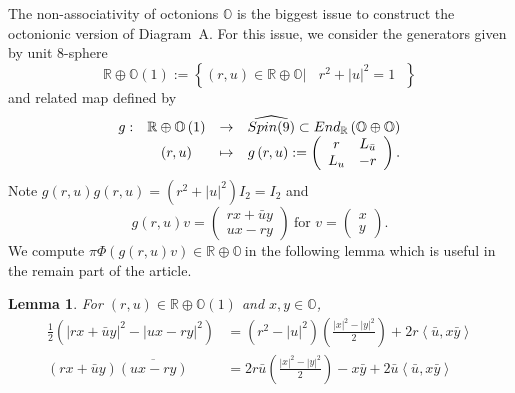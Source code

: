 \documentclass[a4paper]{article}%
\newtheorem{lemma}[theorem]{Lemma}
\begin{document}
\bigskip

The non-associativity of octonions $\mathbb{O}$ is the biggest issue to
construct the octonionic version of Diagram\ A. For this issue, we consider
the generators given by unit $8$-sphere
\[
\mathbb{R\oplus O}\left(  1\right)  :=\left\{  \left.  \left(  r,u\right)
\in\mathbb{R\oplus O}\right\vert \ \text{ }r^{2}+\left\vert u\right\vert
^{2}=1\text{ }\right\}
\]
and related map defined by%
\[%
\begin{array}
[c]{cccc}%
g: & \mathbb{R\oplus O}\left(  1\right)  & \rightarrow & \widehat
{Spin(9)}\subset End_{\mathbb{R}}\left(  \mathbb{O\oplus O}\right) \\
& \left(  r,u\right)  & \mapsto & g\left(  r,u\right)  :=\left(
\begin{array}
[c]{cc}%
r & L_{\bar{u}}\\
L_{u} & -r
\end{array}
\right)  .
\end{array}
\]
Note $g\left(  r,u\right)  g\left(  r,u\right)  =\left(  r^{2}+\left\vert
u\right\vert ^{2}\right)  I_{2}=I_{2}$ and
\[
g\left(  r,u\right)  v=%
\begin{pmatrix}
rx+\bar{u}y\\
ux-ry
\end{pmatrix}
\ \text{for }v=%
\begin{pmatrix}
x\\
y
\end{pmatrix}
.
\]
We compute $\pi\Phi\left(  g\left(  r,u\right)  v\right)  \in\mathbb{R\oplus
O\ }$in the following lemma which is useful in the remain part of the article.

\begin{lemma}
\label{HopfOctKeyLemma}For $\left(  r,u\right)  \in\mathbb{R\oplus O}\left(
1\right)  $ and $x,y\in\mathbb{O}$,%
\begin{align*}
\frac{1}{2}\left(  \left\vert rx+\bar{u}y\right\vert ^{2}-\left\vert
ux-ry\right\vert ^{2}\right)   &  =\left(  r^{2}-\left\vert u\right\vert
^{2}\right)  \left(  \frac{\left\vert x\right\vert ^{2}-\left\vert
y\right\vert ^{2}}{2}\right)  +2r\left\langle \bar{u},x\bar{y}\right\rangle \\
\left(  rx+\bar{u}y\right)  \overline{\left(  ux-ry\right)  }  &  =2r\bar
{u}\left(  \frac{\left\vert x\right\vert ^{2}-\left\vert y\right\vert ^{2}}%
{2}\right)  -x\bar{y}+2\bar{u}\left\langle \bar{u},x\bar{y}\right\rangle
\end{align*}

\end{lemma}
\end{document}
